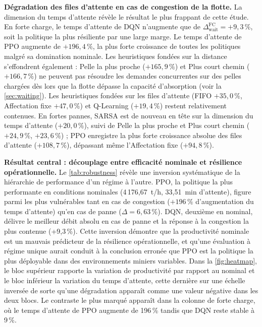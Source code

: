 \documentclass[11pt,a4paper]{article}
\begin{document}
\noindent\textbf{Dégradation des files d'attente en cas de congestion de la flotte.} La dimension du temps d'attente révèle le résultat le plus frappant de cette étude. En forte charge, le temps d'attente de DQN n'augmente que de $\Delta_{\mathrm{wait}}^{\mathrm{FC}}=+9{,}3\,\%$, soit la politique la plus résiliente par une large marge. Le temps d'attente de PPO augmente de $+196{,}4\,\%$, la plus forte croissance de toutes les politiques malgré sa domination nominale. Les heuristiques fondées sur la distance s'effondrent également : Pelle la plus proche ($+165{,}9\,\%$) et Plus court chemin ($+166{,}7\,\%$) ne peuvent pas résoudre les demandes concurrentes sur des pelles chargées dès lors que la flotte dépasse la capacité d'absorption (voir la \cref{sec:waiting}). Les heuristiques fondées sur les files d'attente (FIFO $+35{,}0\,\%$, Affectation fixe $+47{,}0\,\%$) et Q-Learning ($+19{,}4\,\%$) restent relativement contenues. En fortes pannes, SARSA est de nouveau en tête sur la dimension du temps d'attente ($+20{,}0\,\%$), suivi de Pelle la plus proche et Plus court chemin ($+24{,}9\,\%$, $+23{,}6\,\%$) ; PPO enregistre la plus forte croissance absolue des files d'attente ($+108{,}7\,\%$), dépassant même l'Affectation fixe ($+94{,}8\,\%$).

\medskip
\noindent\textbf{Résultat central : découplage entre efficacité nominale et résilience opérationnelle.} Le \cref{tab:robustness} révèle une inversion systématique de la hiérarchie de performance d'un régime à l'autre. PPO, la politique la plus performante en conditions nominales (4\,176,67~t/h, 33,51~min d'attente), figure parmi les plus vulnérables tant en cas de congestion ($+196\,\%$ d'augmentation du temps d'attente) qu'en cas de panne ($\Delta=6{,}63\,\%$). DQN, deuxième en nominal, délivre le meilleur débit absolu en cas de panne et la réponse à la congestion la plus contenue (+9,3\,\%). Cette inversion démontre que la productivité nominale est un mauvais prédicteur de la résilience opérationnelle, et qu'une évaluation à régime unique aurait conduit à la conclusion erronée que PPO est la politique la plus déployable dans des environnements miniers variables. Dans la \cref{fig:heatmap}, le bloc supérieur rapporte la variation de productivité par rapport au nominal et le bloc inférieur la variation du temps d'attente, cette dernière sur une échelle inversée de sorte qu'une dégradation apparaît comme une valeur négative dans les deux blocs. Le contraste le plus marqué apparaît dans la colonne de forte charge, où le temps d'attente de PPO augmente de 196\,\% tandis que DQN reste stable à 9\,\%.
\end{document}
